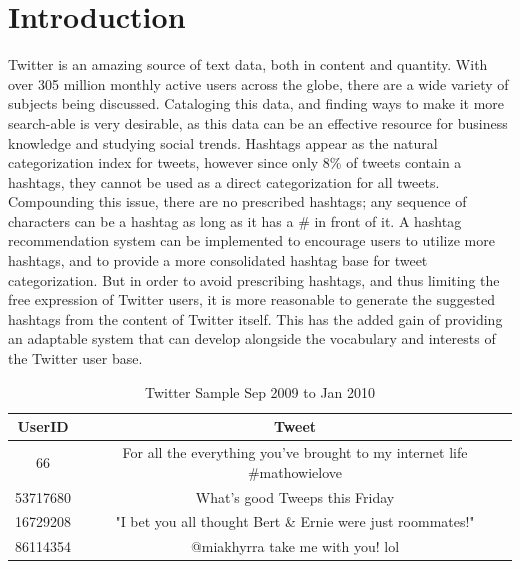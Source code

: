 \documentclass{acm_proc_article-sp}
\begin{document}
\section{Introduction}
\hspace*{5mm}Twitter is an amazing source of text data, both in content and quantity. With over 305 million monthly active users across the globe, there are a wide variety of subjects being discussed. Cataloging this data, and finding ways to make it more search-able is very desirable, as this data can be an effective resource for business knowledge and studying social trends. Hashtags appear as the natural categorization index for tweets, however since only 8\% of tweets contain a hashtags, they cannot be used as a direct categorization for all tweets. Compounding this issue, there are no prescribed hashtags; any sequence of characters can be a hashtag as long as it has a \# in front of it. A hashtag recommendation system can be implemented to encourage users to utilize more hashtags, and to provide a more consolidated hashtag base for tweet categorization. But in order to avoid prescribing hashtags, and thus limiting the free expression of Twitter users, it is more reasonable to generate the suggested hashtags from the content of Twitter itself. This has the added gain of providing an adaptable system that can develop alongside the vocabulary and interests of the Twitter user base.

\begin{table}[t]
	\caption{Twitter Sample Sep 2009 to Jan 2010}
	\centering
	\begin{tabular}{c c}   
		\hline\hline\rule{0pt}{2ex}
		UserID & Tweet \\
		\hline\rule{0pt}{3ex}
		66 & For all the everything you've brought to my internet life \#mathowielove \\
		53717680 & What's good Tweeps this Friday \\
		16729208 &"I bet you all thought Bert \& Ernie were just roommates!" \\ 
		86114354 & @miakhyrra take me with you! lol \\ [1ex] 
		\hline 
	\end{tabular}
	\label{table:sample} %
\end{table}
\end{document}
